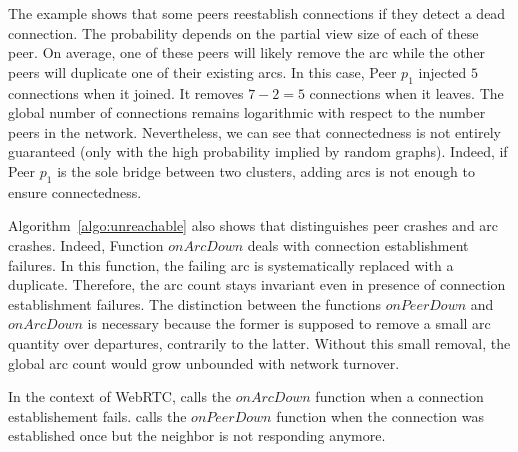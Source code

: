 The example shows that some peers reestablish connections if they
detect a dead connection. The probability depends on the partial view
size of each of these peer. On average, one of these peers will likely
remove the arc while the other peers will duplicate one of their
existing arcs. In this case, Peer $p_1$ injected $5$ connections when
it joined. It removes $7-2 =5 $ connections when it leaves. The global
number of connections remains logarithmic with respect to the number
peers in the network. Nevertheless, we can see that connectedness is
not entirely guaranteed (only with the high probability implied by
random graphs). Indeed, if Peer $p_1$ is the sole bridge between two
clusters, adding arcs is not enough to ensure connectedness.

Algorithm~\ref{algo:unreachable} also shows that \SPRAY distinguishes peer
crashes and arc crashes. Indeed, Function $onArcDown$ deals with connection
establishment failures. In this function, the failing arc is systematically
replaced with a duplicate. Therefore, the arc count stays invariant even in
presence of connection establishment failures. The distinction between the
functions $onPeerDown$ and $onArcDown$ is necessary because the former is
supposed to remove a small arc quantity over departures, contrarily to the
latter. Without this small removal, the global arc count would grow unbounded
with network turnover.

In the context of WebRTC, \SPRAY calls the $onArcDown$ function when a connection
establishement fails. \SPRAY calls the $onPeerDown$ function when the
connection was established once but the neighbor is not responding anymore.



